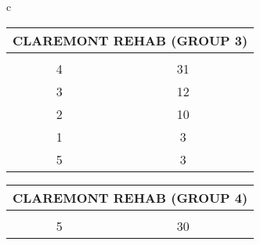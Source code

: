 \begin{table}[H]
        \small
        \begin{tabular}{c}
                            
                        \begin{tabular}{cc}
                        \multicolumn{2}{l}{CLAREMONT REHAB (GROUP 3)}                                                                                                                                   \\ \hline
                        \rowcolor{\ccorange} 
                        \multicolumn{1}{|c|}{\cellcolor{\ccorange}{\color[HTML]{FFFFFF} Building}} & \multicolumn{1}{c|}{\cellcolor{\ccorange}{\color[HTML]{FFFFFF} Total Repairs}} \\ \hline
                        \multicolumn{1}{|c|}{4}                                                        & \multicolumn{1}{c|}{31}                                                             \\ \hline
\multicolumn{1}{|c|}{3}                                                        & \multicolumn{1}{c|}{12}                                                             \\ \hline
\multicolumn{1}{|c|}{2}                                                        & \multicolumn{1}{c|}{10}                                                             \\ \hline
\multicolumn{1}{|c|}{1}                                                        & \multicolumn{1}{c|}{3}                                                             \\ \hline
\multicolumn{1}{|c|}{5}                                                        & \multicolumn{1}{c|}{3}                                                             \\ \hline
\end{tabular}
                        \begin{tabular}{cc}
                        \multicolumn{2}{l}{CLAREMONT REHAB (GROUP 4)}                                                                                                                                   \\ \hline
                        \rowcolor{\ccorange} 
                        \multicolumn{1}{|c|}{\cellcolor{\ccorange}{\color[HTML]{FFFFFF} Building}} & \multicolumn{1}{c|}{\cellcolor{\ccorange}{\color[HTML]{FFFFFF} Total Repairs}} \\ \hline
                        \multicolumn{1}{|c|}{5}                                                        & \multicolumn{1}{c|}{30}                                                             \\ \hline

\end{tabular}
\end{tabular}
\end{table}
